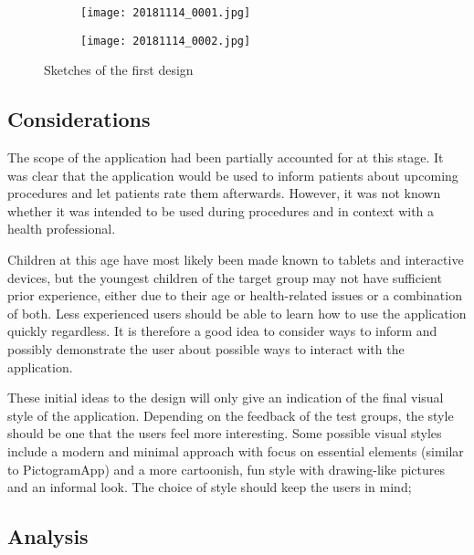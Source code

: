 \begin{figure}
    \centering
    \begin{subfigure}{0.95\textwidth}
        \centering
        \texttt{[image: 20181114\_0001.jpg]}
        \label{fig:sketch-viewprocedure}
    \end{subfigure}
    \begin{subfigure}{0.95\textwidth}
        \centering
        \texttt{[image: 20181114\_0002.jpg]}
        \label{fig:sketch-editprocedure}
    \end{subfigure}
    \caption{Sketches of the first design}
    \label{fig:sketch-firstdesign}
\end{figure}

\subsection{Considerations}

The scope of the application had been partially accounted for at this stage. It was clear that the application would be used to inform patients about upcoming procedures and let patients rate them afterwards. However, it was not known whether it was intended to be used during procedures and in context with a health professional.

Children at this age have most likely been made known to tablets and interactive devices, but the youngest children of the target group may not have sufficient prior experience, either due to their age or health-related issues or a combination of both. Less experienced users should be able to learn how to use the application quickly regardless. It is therefore a good idea to consider ways to inform and possibly demonstrate the user about possible ways to interact with the application.

These initial ideas to the design will only give an indication of the final visual style of the application. Depending on the feedback of the test groups, the style should be one that the users feel more interesting. Some possible visual styles include a modern and minimal approach with focus on essential elements (similar to PictogramApp) and a more cartoonish, fun style with drawing-like pictures and an informal look. The choice of style should keep the users in mind; 

\subsection{Analysis}

